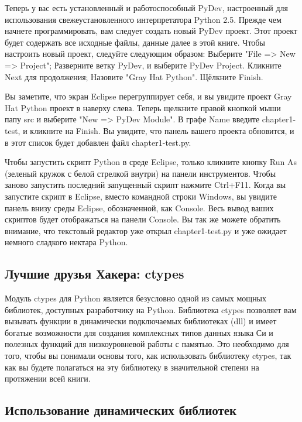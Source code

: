 \documentclass[12pt]{book}
\begin{document}
Теперь у вас есть установленный и работоспособный PyDev, настроенный для использования свежеустановленного интерпретатора Python 2.5. Прежде чем начнете программировать, вам следует создать новый PyDev проект. Этот проект будет содержать все исходные файлы, данные далее в этой книге. Чтобы настроить новый проект, следуйте следующим образом:
Выберите "File => New => Project";
Разверните ветку PyDev, и выберите PyDev Project. Кликните Next для продолжения;
Назовите "Gray Hat Python". Щёлкните Finish.

Вы заметите, что экран Eclipse перегруппирует себя, и вы увидите проект Gray Hat Python проект в наверху слева. Теперь щелкните правой кнопкой мыши папу src и выберите "New => PyDev Module". В графе Name введите chapter1-test, и кликните на Finish. Вы увидите, что панель вашего проекта обновится, и в этот список будет добавлен файл chapter1-test.py.

Чтобы запустить скрипт Python в среде Eclipse, только кликните кнопку Run As (зеленый кружок с белой стрелкой внутри) на панели инструментов. Чтобы заново запустить последний запущенный скрипт нажмите Ctrl+F11. Когда вы запустите скрипт в Eclipse, вместо командной строки Windows, вы увидите панель внизу среды Eclipse, обозначенной, как Console. Весь вывод ваших скриптов будет отображаться на панели Console. Вы так же можете обратить внимание, что текстовый редактор уже открыл chapter1-test.py и уже ожидает немного сладкого нектара Python.

\subsection{Лучшие друзья Хакера: ctypes}

Модуль ctypes для Python является безусловно одной из самых мощных библиотек, доступных разработчику на Python. Библиотека ctypes позволяет вам вызывать функции в динамически подключаемых библиотеках (dll) и имеет богатые возможности для создания комплексных типов данных языка Си и полезных функций для низкоуровневой работы с памятью. Это необходимо для того, чтобы вы понимали основы того, как использовать библиотеку ctypes, так как вы будете полагаться на эту библиотеку в значительной степени на протяжении всей книги.

\subsection{Использование динамических библиотек}
\end{document}
